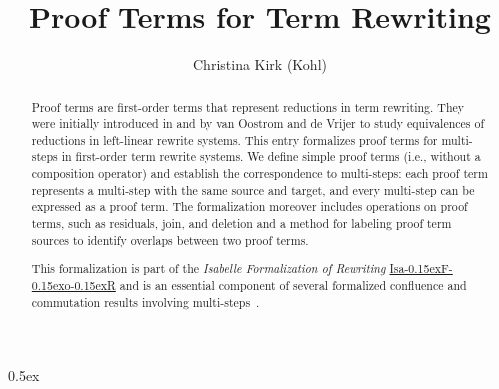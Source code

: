 \documentclass[11pt,a4paper]{article}
\newcommand\isafor{\textsf{Isa\kern-0.15exF\kern-0.15exo\kern-0.15exR}}
\begin{document}
\title{Proof Terms for Term Rewriting}
\author{Christina Kirk (Kohl)}
\maketitle

\begin{abstract}
  Proof terms are first-order terms that represent reductions in term rewriting.
  They were initially introduced in \cite{vOdV02} and \cite[Chapter 8]{TeReSe}
  by van Oostrom and de Vrijer to study equivalences of reductions in left-linear
  rewrite systems.
  This entry formalizes proof terms for multi-steps in first-order term rewrite systems.
  We define simple proof terms (i.e., without a composition operator) and establish
  the correspondence to multi-steps: each proof term represents a multi-step
  with the same source and target, and every multi-step can be expressed as a proof term.
  The formalization moreover includes operations on proof terms, such as residuals,
  join, and deletion and a method for labeling proof term sources to identify
  overlaps between two proof terms.

  This formalization is part of the \emph{Isabelle Formalization of Rewriting}
  \href{http://cl-informatik.uibk.ac.at/isafor/}{\isafor{}} and is an essential component
  of several formalized confluence and commutation results
  involving multi-steps~\cite{KM23a, KM23b, KM23c, KM25}.
\end{abstract}

\tableofcontents

\parindent 0pt\parskip 0.5ex





\end{document}
